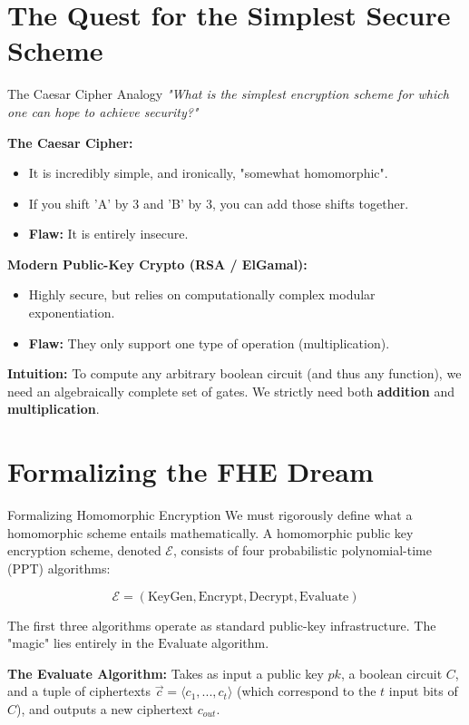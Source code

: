 \documentclass[10pt, aspectratio=169]{beamer}
\begin{document}
\section{The Quest for the Simplest Secure Scheme}
\begin{frame}{The Caesar Cipher Analogy}
    \textit{"What is the simplest encryption scheme for which one can hope to achieve security?"}
    \pause
    
    \vspace{0.3cm}
    \textbf{The Caesar Cipher:}
    \begin{itemize}
        \item It is incredibly simple, and ironically, "somewhat homomorphic".
        \item If you shift 'A' by 3 and 'B' by 3, you can add those shifts together. 
        \item \textbf{Flaw:} It is entirely insecure.
    \end{itemize}
    \pause

    \vspace{0.3cm}
    \textbf{Modern Public-Key Crypto (RSA / ElGamal):}
    \begin{itemize}
        \item Highly secure, but relies on computationally complex modular exponentiation.
        \item \textbf{Flaw:} They only support one type of operation (multiplication).
    \end{itemize}
    \pause
    
    \vspace{0.3cm}
    \textbf{Intuition:} To compute any arbitrary boolean circuit (and thus any function), we need an algebraically complete set of gates. We strictly need both \textbf{addition} and \textbf{multiplication}.
\end{frame}

\section{Formalizing the FHE Dream}
\begin{frame}{Formalizing Homomorphic Encryption}
    We must rigorously define what a homomorphic scheme entails mathematically. A homomorphic public key encryption scheme, denoted $\mathcal{E}$, consists of four probabilistic polynomial-time (PPT) algorithms:
    
    \pause
    $$\mathcal{E} = (\text{KeyGen}, \text{Encrypt}, \text{Decrypt}, \text{Evaluate})$$
    
    \vspace{0.3cm}
    The first three algorithms operate as standard public-key infrastructure. The "magic" lies entirely in the $\text{Evaluate}$ algorithm.
    \pause
    
    \vspace{0.3cm}
    \textbf{The Evaluate Algorithm:}
    Takes as input a public key $pk$, a boolean circuit $C$, and a tuple of ciphertexts $\vec{c}=\langle c_{1},...,c_{t}\rangle$ (which correspond to the $t$ input bits of $C$), and outputs a new ciphertext $c_{out}$.
\end{frame}
\end{document}
